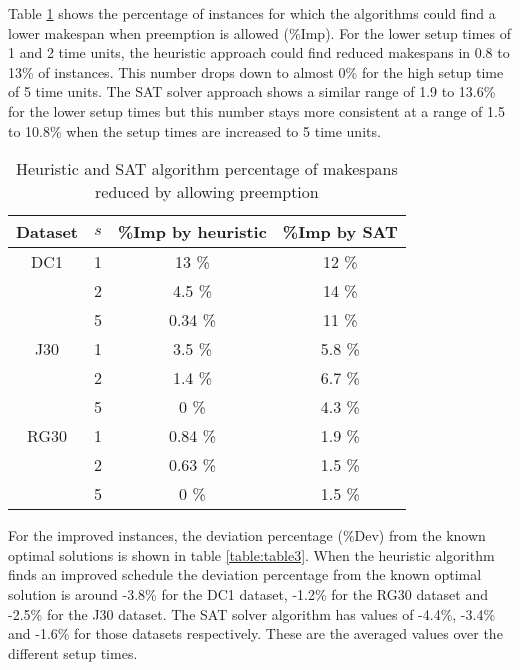 Table \ref{table:table2} shows the percentage of instances for which the algorithms could find a lower makespan when preemption is allowed (\%Imp). For the lower setup times of 1 and 2 time units, the heuristic approach could find reduced makespans in 0.8 to 13\% of instances. This number drops down to almost 0\% for the high setup time of 5 time units. The SAT solver approach shows a similar range of 1.9 to 13.6\% for the lower setup times but this number stays more consistent at a range of 1.5 to 10.8\% when the setup times are increased to 5 time units.

\begin{table}
	\begin{center}
		\caption{Heuristic and SAT algorithm percentage of makespans reduced by allowing preemption}
		\label{table:table2}
		\begin{tabular}{ c | c c c }
			Dataset & \(s\) & \%Imp by heuristic & \%Imp by SAT \\
			\hline
			DC1  & 1 & 13 \% & 12 \% \\ 
			  & 2 & 4.5 \% & 14 \% \\  
			  & 5 & 0.34 \% & 11 \% \\ 
			J30  & 1 & 3.5 \% & 5.8 \% \\ 
			  & 2 & 1.4 \% & 6.7 \% \\  
			  & 5 & 0 \% & 4.3 \% \\ 
			RG30 & 1 & 0.84 \% & 1.9 \% \\ 
			 & 2 & 0.63 \% & 1.5 \% \\  
			 & 5 & 0 \% & 1.5 \%
		\end{tabular}
	\end{center}
\end{table}

For the improved instances, the deviation percentage (\%Dev) from the known optimal solutions is shown in table \ref{table:table3}. When the heuristic algorithm finds an improved schedule the deviation percentage from the known optimal solution is around -3.8\% for the DC1 dataset, -1.2\% for the RG30 dataset and -2.5\% for the J30 dataset. The SAT solver algorithm has values of -4.4\%, -3.4\% and -1.6\% for those datasets respectively. These are the averaged values over the different setup times.

